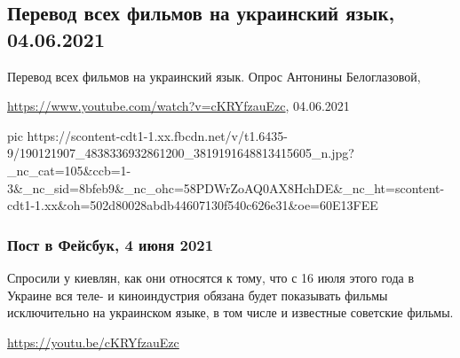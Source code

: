  
 
 
 
 
\subsection{Перевод всех фильмов на украинский язык, 04.06.2021}

Перевод всех фильмов на украинский язык. Опрос Антонины Белоглазовой,\par
\url{https://www.youtube.com/watch?v=cKRYfzauEzc}, 04.06.2021

\ifcmt
  pic https://scontent-cdt1-1.xx.fbcdn.net/v/t1.6435-9/190121907_4838336932861200_3819191648813415605_n.jpg?_nc_cat=105&ccb=1-3&_nc_sid=8bfeb9&_nc_ohc=58PDWrZoAQ0AX8HchDE&_nc_ht=scontent-cdt1-1.xx&oh=502d80028abdb44607130f540c626e31&oe=60E13FEE
\fi

\subsubsection{Пост в Фейсбук, 4 июня 2021}

Спросили у киевлян, как они относятся к тому, что с 16 июля этого года в
Украине вся теле- и киноиндустрия обязана будет показывать фильмы исключительно
на украинском языке, в том числе и известные советские фильмы.

\url{https://youtu.be/cKRYfzauEzc}

